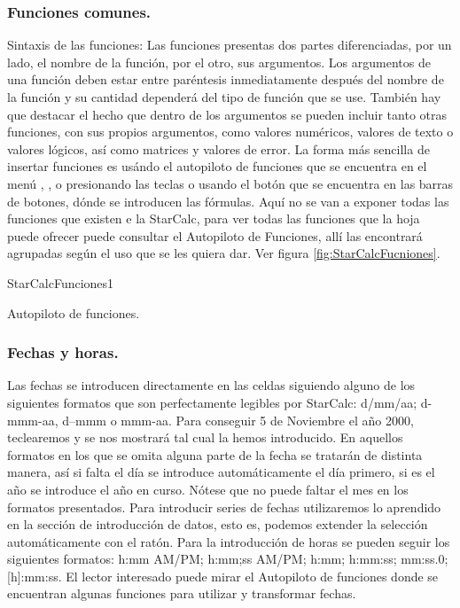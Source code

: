 \subsubsection{Funciones comunes.} 
Sintaxis de las funciones: Las funciones presentas dos partes
diferenciadas, por un lado, el nombre de la función, por el otro, sus
argumentos. Los argumentos de una función deben estar entre paréntesis
inmediatamente después del nombre de la función y su cantidad
dependerá del tipo de función que se use. También hay que destacar el
hecho que dentro de los argumentos se pueden incluir tanto otras
funciones, con sus propios argumentos, como valores numéricos, valores
de texto o valores lógicos, así como matrices y valores de error. La
forma más sencilla de insertar funciones es usándo el autopiloto de
funciones que se encuentra en el menú , ,
o presionando las teclas  o usando el botón que se
encuentra en las barras de botones, dónde se introducen las fórmulas.
Aquí no se van a exponer todas las funciones que existen e la
StarCalc, para ver todas las funciones que la hoja puede ofrecer puede
consultar el Autopiloto de Funciones, allí las encontrará agrupadas
según el uso que se les quiera dar. Ver figura \ref{fig:StarCalcFucniones}.

\begin{figura}{StarCalcFunciones}{1}
\caption{Autopiloto de funciones.}
\label{fig:StarCalcFucniones}
\end{figura}


\subsubsection{Fechas y horas.} 
Las fechas se introducen directamente en las celdas siguiendo alguno
de los siguientes formatos que son perfectamente legibles por
StarCalc: d/mm/aa; d-mmm-aa, d--mmm o mmm-aa. Para conseguir 5 de
Noviembre el año 2000, teclearemos  y se nos
mostrará tal cual la hemos introducido. En aquellos formatos en los
que se omita alguna parte de la fecha se tratarán de distinta manera,
así si falta el día se introduce automáticamente el día primero, si es
el año se introduce el año en curso.  Nótese que no puede faltar el
mes en los formatos presentados. Para introducir series de fechas
utilizaremos lo aprendido en la sección de introducción de datos, esto
es, podemos extender la selección automáticamente con el ratón.  Para
la introducción de horas se pueden seguir los siguientes formatos:
h:mm AM/PM; h:mm;ss AM/PM; h:mm; h:mm:ss; mm:ss.0; [h]:mm:ss. El
lector interesado puede mirar el Autopiloto de funciones donde se
encuentran algunas funciones para utilizar y transformar fechas.
 
